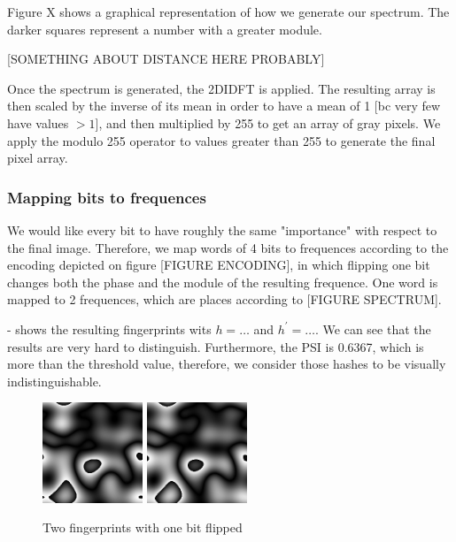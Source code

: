 \documentclass{article}
\begin{document}
Figure X shows a graphical representation of how we generate our spectrum. The darker squares represent a number with a greater module.

[SOMETHING ABOUT DISTANCE HERE PROBABLY]

Once the spectrum is generated, the 2DIDFT is applied. The resulting array is then scaled by the inverse of its mean in order to have a mean of 1 [bc very few have values $> 1$], and then multiplied by 255 to get an array of gray pixels. We apply the modulo 255 operator to values greater than 255 to generate the final pixel array. 

\subsubsection{Mapping bits to frequences}
We would like every bit to have roughly the same "importance" with respect to the final image. Therefore, we map words of 4 bits to frequences according to the encoding depicted on figure [FIGURE ENCODING], in which flipping one bit changes both the phase and the module of the resulting frequence. One word is mapped to 2 frequences, which are places according to [FIGURE SPECTRUM].

- shows the resulting fingerprints wits $h = \dots$ and $h^\prime = \dots$. We can see that the results are very hard to distinguish. Furthermore, the PSI is 0.6367, which is more than the threshold value, therefore, we consider those hashes to be visually indistinguishable.

\begin{center}
\begin{figure}
    \centering
    \includegraphics[width=3cm]{figures/Nothing.png}
    \hspace{4pt}
    \includegraphics[width=3cm]{figures/NothingP67Psi0664}
    \caption{Two fingerprints with one bit flipped}
    \label{fig:nothing}
\end{figure}
\end{center}
\end{document}
